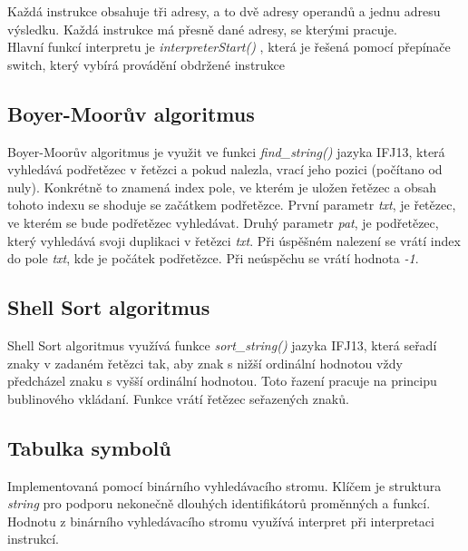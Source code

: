 \documentclass[11pt,a4paper,titlepage]{article}
\begin{document}
   	\smallskip
  	\hspace{1cm} Každá instrukce  obsahuje tři adresy, a to dvě adresy operandů a jednu adresu výsledku. Každá instrukce má přesně dané adresy, se kterými pracuje. \\
Hlavní funkcí interpretu je \emph{interpreterStart()} , která je řešená pomocí přepínače switch, který vybírá provádění obdržené  instrukce

	\subsection{Boyer-Moorův algoritmus}
	\bigskip
  	\hspace{1cm} Boyer-Moorův algoritmus je využit ve funkci \emph{find\_string()} jazyka IFJ13, která vyhledává pod\-ře\-tě\-zec v řetězci a pokud nalezla, vrací jeho pozici (počítano od nuly). Konkrétně to znamená index pole, \newline ve kterém je uložen řetězec a obsah tohoto indexu se shoduje se začátkem podřetězce. První parametr \emph{txt}, je řetězec, ve kterém se bude podřetězec vyhledávat. Druhý parametr \emph{pat}, je podřetězec, který vyhledává svoji duplikaci v řetězci \emph{txt}. Při úspěšném nalezení se vrátí index do pole \emph{txt}, kde je počátek podřetězce. Při neúspěchu se vrátí hodnota \emph{-1}.
  \smallskip
  
	\subsection{Shell Sort algoritmus}
	\bigskip
  	\hspace{1cm} Shell Sort algoritmus využívá funkce \emph{sort\_string()} jazyka IFJ13, která seřadí znaky v zadaném řetězci tak, aby znak s nižší ordinální hodnotou vždy předcházel znaku s vyšší ordinální hodnotou. Toto řazení pracuje na principu bublinového vkládaní. Funkce vrátí řetězec seřazených znaků.
	\smallskip
	
	\subsection{Tabulka symbolů}
	\bigskip
  	\hspace{1cm} Implementovaná pomocí binárního vyhledávacího stromu. Klíčem je struktura \emph{string} pro podporu nekonečně dlouhých identifikátorů proměnných a funkcí. Hodnotu z binárního vyhledávacího stromu využívá interpret při interpretaci instrukcí. 
	\smallskip
\end{document}
